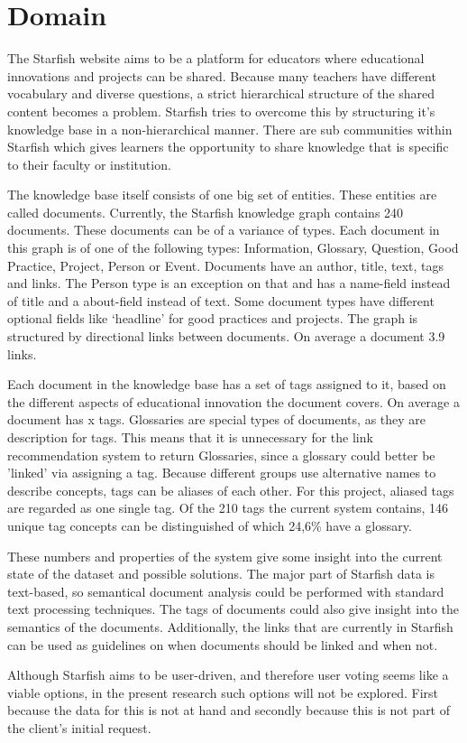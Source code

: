 

\section{Domain}
The Starfish website aims to be a platform for educators where educational innovations and projects can be shared. Because many teachers have different vocabulary and diverse questions, a strict hierarchical structure of the shared content becomes a problem. Starfish tries to overcome this by structuring it's knowledge base in a non-hierarchical manner. There are sub communities within Starfish which gives learners the opportunity to share knowledge that is specific to their faculty or institution. 

The knowledge base itself consists of one big set of entities. These entities are called documents. Currently, the Starfish knowledge graph contains 240 documents. These documents can be of a variance of types. Each document in this graph is of one of the following types: Information, Glossary, Question, Good Practice, Project, Person or Event. Documents have an author, title, text, tags and links. The Person type is an exception on that and has a name-field instead of title and a about-field instead of text. Some document types have different optional fields like `headline' for good practices and projects. The graph is structured by directional links between documents.  On average a document 3.9 links.

Each document in the knowledge base has a set of tags assigned to it, based on the different aspects of educational innovation the document covers. On average a document has x tags. Glossaries are special types of documents, as they are description for tags. This means that it is unnecessary for the link recommendation system to return Glossaries, since a glossary could better be 'linked' via assigning a tag. Because different groups use alternative names to describe concepts, tags can be aliases of each other. For this project, aliased tags are regarded as one single tag. Of the 210 tags the current system contains, 146 unique tag concepts can be distinguished of which 24,6\% have a glossary. 

These numbers and properties of the system give some insight into the current
state of the dataset and possible solutions. The major part of Starfish data is
text-based, so semantical document analysis could be performed with standard
text processing techniques. The tags of documents could also give insight into
the semantics of the documents. Additionally, the links that are currently in
Starfish can be used as guidelines on when documents should be linked and when
not. 

Although Starfish aims to be user-driven, and therefore user voting seems like
a viable options, in the present research such options will not be explored. 
First because the data for this is not at hand and secondly because this is
not part of the client's initial request.
